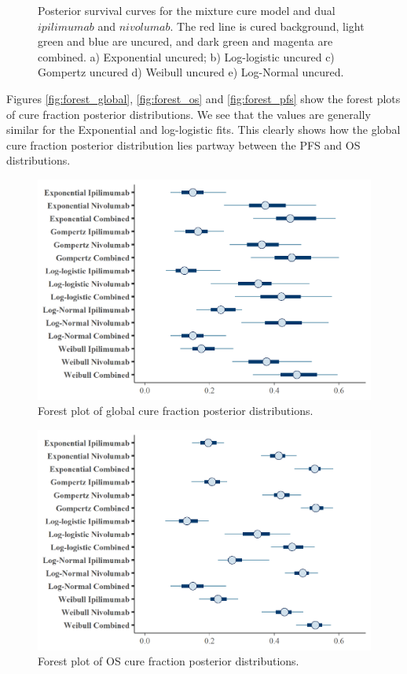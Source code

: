 \documentclass[
]{article}
\begin{document}
\begin{figure}
{}

\caption{\label{fig:NIVO+IPI}Posterior survival curves for the mixture cure model and dual $ipilimumab$ and $nivolumab$. The red line is cured background, light green and blue are uncured, and dark green and magenta are combined. a) Exponential uncured; b) Log-logistic uncured c) Gompertz uncured d) Weibull uncured e) Log-Normal uncured.}\label{fig:unnamed-chunk-5}
\end{figure}

Figures \ref{fig:forest_global}, \ref{fig:forest_os} and
\ref{fig:forest_pfs} show the forest plots of cure fraction posterior
distributions. We see that the values are generally similar for the
Exponential and log-logistic fits. This clearly shows how the global
cure fraction posterior distribution lies partway between the PFS and OS
distributions.

\begin{figure}

{\centering \includegraphics[width=0.6\linewidth]{../plots/cf_global_forest_plot} 

}

\caption{\label{fig:forest_global}Forest plot of global cure fraction posterior distributions.}\label{fig:unnamed-chunk-6}
\end{figure}

\begin{figure}

{\centering \includegraphics[width=0.6\linewidth]{../plots/cf_os_forest_plot} 

}

\caption{\label{fig:forest_os}Forest plot of OS cure fraction posterior distributions.}\label{fig:unnamed-chunk-7}
\end{figure}
\end{document}

